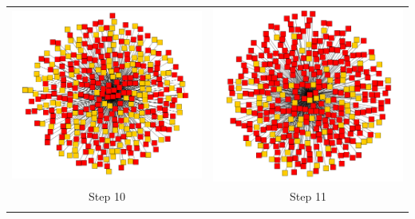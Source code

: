 \documentclass[12pt, oneside, openany]{article} %
\newcommand\Bstrut{\rule[-0.9ex]{0pt}{0pt}} %
\begin{document}
\begin{table}[p]
\begin{tabular}{| c | c |}
  	\includegraphics[scale=0.11]{comp10.png} & \includegraphics[scale=0.11]{comp11.png}  \\
	Step 10 & Step 11 \Bstrut \\
  	\hline
&\\

\end{tabular}
\end{table}
\end{document}

